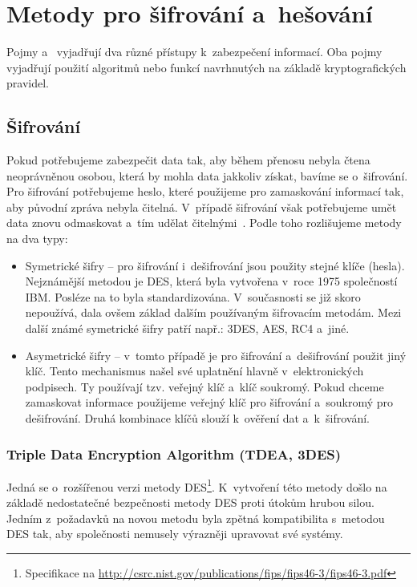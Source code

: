 \chapter{Metody pro šifrování a~hešování}
\label{ch:sifrovani}
Pojmy  a~ vyjadřují dva různé přístupy k~zabezpečení informací. Oba pojmy
vyjadřují použití algoritmů nebo funkcí navrhnutých na základě kryptografických pravidel. 
\section{Šifrování}
Pokud potřebujeme zabezpečit data tak, aby během přenosu nebyla čtena neoprávněnou osobou, která by
mohla data jakkoliv získat, bavíme se o~šifrování. Pro šifrování potřebujeme heslo, které použijeme
pro zamaskování informací tak, aby původní zpráva nebyla čitelná. V~případě šifrování však
potřebujeme umět data znovu odmaskovat a~tím udělat čitelnými~\cite{AC:1996}. Podle toho rozlišujeme metody na dva
typy:
\begin{itemize}
    \item Symetrické šifry -- pro šifrování i~dešifrování jsou použity stejné klíče (hesla).
        Nejznámější metodou je DES, která byla vytvořena v~roce 1975 společností IBM. Posléze na to
        byla standardizována. V~současnosti se již skoro nepoužívá, dala ovšem základ dalším
        používaným šifrovacím metodám. Mezi další známé symetrické šifry patří např.: 3DES, AES, RC4
        a~jiné.
    \item Asymetrické šifry -- v~tomto případě je pro šifrování a~dešifrování použit jiný klíč.
        Tento mechanismus našel své uplatnění hlavně v~elektronických podpisech. Ty používají tzv.
        veřejný klíč a~klíč soukromý. Pokud chceme zamaskovat informace použijeme veřejný klíč pro
        šifrování a~soukromý pro dešifrování. Druhá kombinace klíčů slouží k~ověření dat a~k~šifrování.
\end{itemize}

\subsection{Triple Data Encryption Algorithm (TDEA, 3DES)}
Jedná se o~rozšířenou verzi metody
DES\footnote{Specifikace na \url{http://csrc.nist.gov/publications/fips/fips46-3/fips46-3.pdf}}.
K~vytvoření této metody došlo na základě nedostatečné bezpečnosti metody DES proti útokům hrubou
silou. Jedním z~požadavků na novou metodu byla zpětná kompatibilita s~metodou DES tak, aby
společnosti nemusely výrazněji upravovat své systémy.

